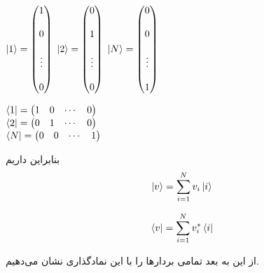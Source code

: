 \begin{multicols}{3}

$\ket{1} = \begin{pmatrix} 1 \\ \\ 0 \\ \\ \vdots \\ \\ 0 \end{pmatrix}$
  \columnbreak{}
$\ket{2} = \begin{pmatrix} 0 \\ \\ 1 \\ \\ \vdots \\ \\ 0 \end{pmatrix}$
  \columnbreak{}
$\ket{N} = \begin{pmatrix} 0 \\ \\ 0 \\ \\ \vdots \\ \\ 1 \end{pmatrix}$

\end{multicols}
\begin{flushleft}
$\bra{1} = \begin{pmatrix} 1 & 0 & \cdots & 0 \end{pmatrix}$
\\
$\bra{2} = \begin{pmatrix} 0 & 1 & \cdots & 0 \end{pmatrix}$
\\
$\bra{N} = \begin{pmatrix} 0 & 0 & \cdots & 1 \end{pmatrix}$
\\
\end{flushleft}

بنابراین داریم 
\begin{equation}
	\ket{v} = \sum_{i=1}^{N} v_{i}\ket{i}
\end{equation}

\begin{equation}
	\bra{v} = \sum_{i=1}^{N} v^{*}_{i}\bra{i}
\end{equation}

از این به بعد تمامی بردارها را با این نماد‌گذاری نشان می‌دهیم. 

